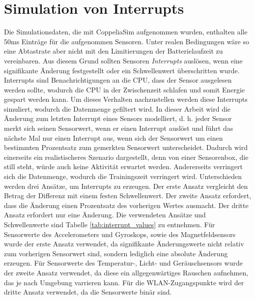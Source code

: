 \section{Simulation von Interrupts}
Die Simulationsdaten, die mit CoppeliaSim aufgenommen wurden, enthalten alle 50ms Einträge für die aufgenommen Sensoren.
Unter realen Bedingungen wäre so eine Abtastrate aber nicht mit den Limitierungen der Batterielaufzeit zu vereinbaren.
Aus diesem Grund sollten Sensoren \textit{Interrupts} auslösen, wenn eine signifikante Änderung festgestellt oder ein Schwellenwert überschritten wurde.
Interrupts sind Benachrichtigungen an die CPU, dass der Sensor ausgelesen werden sollte, wodurch die CPU in der Zwischenzeit schlafen und somit Energie gespart werden kann.
\newline
\newline
Um dieses Verhalten nachzustellen werden diese Interrupts simuliert, wodurch die Datenmenge gefiltert wird.
In dieser Arbeit wird die Änderung zum letzten Interrupt eines Sensors modelliert,
d. h. jeder Sensor merkt sich seinen Sensorwert, wenn er einen Interrupt auslöst
und führt das nächste Mal nur einen Interrupt aus, wenn sich der Sensorwert um einen bestimmten Prozentsatz zum gemerkten Sensorwert unterscheidet.
\newpage
Dadurch wird einerseits ein realistischeres Szenario dargestellt,
denn von einer Sensorenbox, die still steht, würde auch keine Aktivität erwartet werden.
Andererseits verringert sich die Datenmenge, wodurch die Trainingszeit verringert wird.
\newline
\newline
Unterschieden werden drei Ansätze, um Interrupts zu erzeugen.
Der erste Ansatz vergleicht den Betrag der Differenz mit einem festen Schwellenwert.
Der zweite Ansatz erfordert, dass die Änderung einen Prozentsatz des vorherigen Wertes ausmacht.
Der dritte Ansatz erfordert nur eine Änderung.
\newline
\newline
Die verwendeten Ansätze und Schwellenwerte sind Tabelle \ref{tab:interrupt_values} zu entnehmen.
Für Sensorwerte des Accelerometers und Gyroskops, sowie des Magnetfeldsensors wurde der erste Ansatz verwendet,
da signifikante Änderungswerte nicht relativ zum vorherigen Sensorwert sind, sondern lediglich eine absolute Änderung erzeugen.
Für Sensorwerte des Temperatur-, Licht- und Geräuschsensors wurde der zweite Ansatz verwendet,
da diese ein allgegenwärtiges Rauschen aufnehmen, das je nach Umgebung varrieren kann.
Für die WLAN-Zugangspunkte wird der dritte Ansatz verwendet, da die Sensorwerte binär sind.
